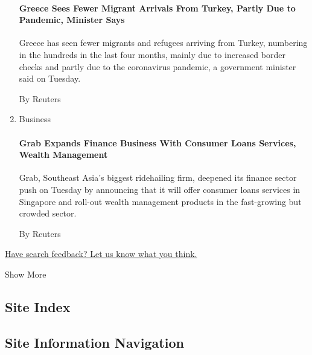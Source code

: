 \begin{enumerate}
  \href{/reuters/2020/08/04/world/europe/04reuters-europe-migrants-greece.html?searchResultPosition=9}{}

  \hypertarget{greece-sees-fewer-migrant-arrivals-from-turkey-partly-due-to-pandemic-minister-says}{%
  \paragraph{Greece Sees Fewer Migrant Arrivals From Turkey, Partly Due
  to Pandemic, Minister
  Says}\label{greece-sees-fewer-migrant-arrivals-from-turkey-partly-due-to-pandemic-minister-says}}

  Greece has seen fewer migrants and refugees arriving from Turkey,
  numbering in the hundreds in the last four months, mainly due to
  increased border checks and partly due to the coronavirus pandemic, a
  government minister said on Tuesday.

  By Reuters
\item
  Business

  \href{/reuters/2020/08/04/business/04reuters-grab-strategy.html?searchResultPosition=10}{}

  \hypertarget{grab-expands-finance-business-with-consumer-loans-services-wealth-management}{%
  \paragraph{Grab Expands Finance Business With Consumer Loans Services,
  Wealth
  Management}\label{grab-expands-finance-business-with-consumer-loans-services-wealth-management}}

  Grab, Southeast Asia's biggest ridehailing firm, deepened its finance
  sector push on Tuesday by announcing that it will offer consumer loans
  services in Singapore and roll-out wealth management products in the
  fast-growing but crowded sector.

  By Reuters
\end{enumerate}

\href{http://nyt.qualtrics.com/jfe/form/SV_ehZpyzWtbwO9HVj?v=a}{Have
search feedback? Let us know what you think.}

Show More

\hypertarget{site-index}{%
\subsection{Site Index}\label{site-index}}

\hypertarget{site-information-navigation}{%
\subsection{Site Information
Navigation}\label{site-information-navigation}}

